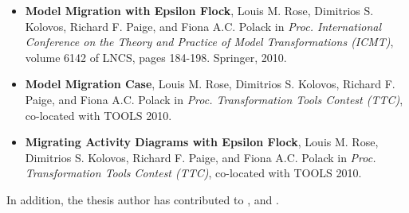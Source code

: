 {\begin{itemize}
		\item \textbf{Model Migration with Epsilon Flock}, Louis M. Rose, Dimitrios S. Kolovos, Richard F. Paige, and Fiona A.C. Polack in \textit{Proc. International Conference on the Theory and Practice of Model Transformations (ICMT)}, volume 6142 of LNCS, pages 184-198. Springer, 2010.
	
		\item \textbf{Model Migration Case}, Louis M. Rose, Dimitrios S. Kolovos, Richard F. Paige, and Fiona A.C. Polack in \textit{Proc. Transformation Tools Contest (TTC)}, co-located with TOOLS 2010.
	
		\item \textbf{Migrating Activity Diagrams with Epsilon Flock}, Louis M. Rose, Dimitrios S. Kolovos, Richard F. Paige, and Fiona A.C. Polack in \textit{Proc. Transformation Tools Contest (TTC)}, co-located with TOOLS 2010.
	\end{itemize}

	In addition, the thesis author has contributed to \cite{kolovos07ewl}, \cite{kolovos07ewlgmf} and \cite{paige08fptc}.
}